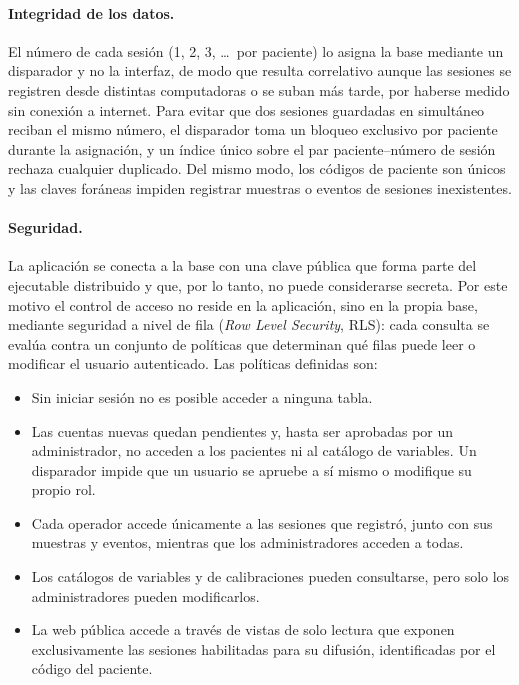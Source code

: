 \documentclass[12pt,a4paper]{article}
\begin{document}
\paragraph{Integridad de los datos.} El número de cada sesión (1, 2, 3, \dots\ por paciente) lo asigna la base mediante un disparador y no la interfaz, de modo que resulta correlativo aunque las sesiones se registren desde distintas computadoras o se suban más tarde, por haberse medido sin conexión a internet. Para evitar que dos sesiones guardadas en simultáneo reciban el mismo número, el disparador toma un bloqueo exclusivo por paciente durante la asignación, y un índice único sobre el par paciente--número de sesión rechaza cualquier duplicado. Del mismo modo, los códigos de paciente son únicos y las claves foráneas impiden registrar muestras o eventos de sesiones inexistentes.

\paragraph{Seguridad.} La aplicación se conecta a la base con una clave pública que forma parte del ejecutable distribuido y que, por lo tanto, no puede considerarse secreta. Por este motivo el control de acceso no reside en la aplicación, sino en la propia base, mediante seguridad a nivel de fila (\textit{Row Level Security}, RLS): cada consulta se evalúa contra un conjunto de políticas que determinan qué filas puede leer o modificar el usuario autenticado. Las políticas definidas son:
\begin{itemize}
    \item Sin iniciar sesión no es posible acceder a ninguna tabla.
    \item Las cuentas nuevas quedan pendientes y, hasta ser aprobadas por un administrador, no acceden a los pacientes ni al catálogo de variables. Un disparador impide que un usuario se apruebe a sí mismo o modifique su propio rol.
    \item Cada operador accede únicamente a las sesiones que registró, junto con sus muestras y eventos, mientras que los administradores acceden a todas.
    \item Los catálogos de variables y de calibraciones pueden consultarse, pero solo los administradores pueden modificarlos.
    \item La web pública accede a través de vistas de solo lectura que exponen exclusivamente las sesiones habilitadas para su difusión, identificadas por el código del paciente.
\end{itemize}
\end{document}
